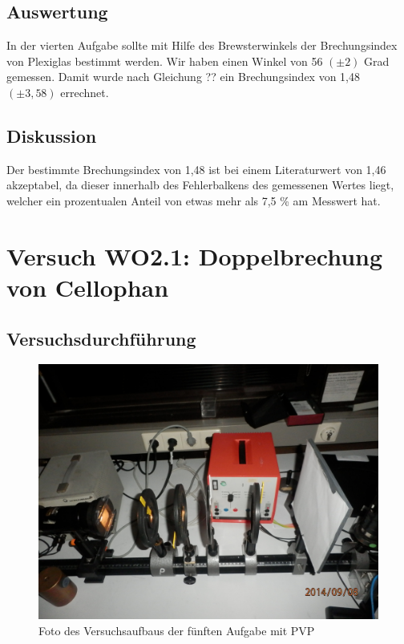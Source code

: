 \documentclass[12pt]{scrartcl}
\begin{document}
\subsection{Auswertung}
In der vierten Aufgabe sollte mit Hilfe des Brewsterwinkels der Brechungsindex von Plexiglas bestimmt werden. Wir haben einen Winkel von 56 $(\pm 2)$ Grad gemessen. Damit wurde nach Gleichung ?? ein Brechungsindex  von 1,48 $(\pm3,58)$ errechnet.
\subsection{Diskussion}
Der bestimmte Brechungsindex von 1,48 ist bei einem Literaturwert von 1,46 akzeptabel, da dieser innerhalb des Fehlerbalkens des gemessenen Wertes liegt, welcher ein prozentualen Anteil von etwas mehr als 7,5 \% am Messwert hat.

\section{Versuch WO2.1:
Doppelbrechung von Cellophan}
\subsection{Versuchsdurchführung}

\begin{figure}[H]
\centering
    \includegraphics[scale = 0.1]{aufgabe_5_1.JPG}
  	\caption[Foto des Versuchsaufbaus der fünften Aufgabe mit PVP]{Foto des Versuchsaufbaus der fünften Aufgabe mit PVP}
  \label{fig:aufgabe_5_1}
\end{figure}
\end{document}
